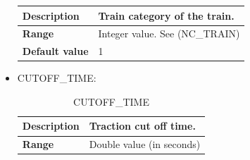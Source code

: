 \begin{itemize}
\begin{longtable}{|l|l|}
					\begin{minipage}[t]{0.22\linewidth} \textbf{Description}	\end{minipage}
				&	\begin{minipage}[t]{0.78\linewidth} Train category of the train. \end{minipage} \\

				\hline

					\begin{minipage}[t]{0.22\linewidth} \textbf{Range}	\end{minipage}
				&	\begin{minipage}[t]{0.78\linewidth} Integer value. See (NC\_TRAIN) \end{minipage} \\

				\hline

					\begin{minipage}[t]{0.22\linewidth} \textbf{Default value}	\end{minipage}
				&	\begin{minipage}[t]{0.78\linewidth} 1 \end{minipage} \\

				\hline

			\end{longtable}

		\item CUTOFF\_TIME:

			\begin{longtable}{|l|l|}
				\caption{CUTOFF\_TIME}\\
				\hline

					\begin{minipage}[t]{0.22\linewidth} \textbf{Description}	\end{minipage}
				&	\begin{minipage}[t]{0.78\linewidth} Traction cut off time. \end{minipage} \\

				\hline

					\begin{minipage}[t]{0.22\linewidth} \textbf{Range}	\end{minipage}
				&	\begin{minipage}[t]{0.78\linewidth} Double value (in seconds) \end{minipage} \\

				\hline


\end{longtable}
\end{itemize}
